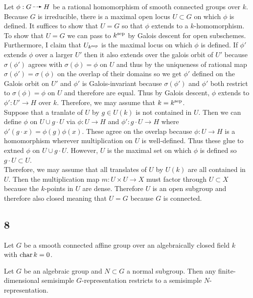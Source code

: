 \documentclass[12pt]{article}
\begin{document}
Let $\phi : G \rat H$ be a rational homomorphism of smooth connected groups over $k$. Because $G$ is irreducible, there is a maximal open locus $U \subset G$ on which $\phi$ is defined. It suffices to show that $U = G$ so that $\phi$ extends to a $k$-homomorphism. To show that $U = G$ we can pass to $k^{\mathrm{sep}}$ by Galois descent for open subschemes. Furthermore, I claim that $U_{k^{\mathrm{sep}}}$ is the maximal locus on which $\phi$ is defined. If $\phi'$ extends $\phi$ over a larger $U'$ then it also extends over the galois orbit of $U'$ because $\sigma(\phi')$ agrees with $\sigma(\phi) = \phi$ on $U$ and thus by the uniqueness of rational map $\sigma(\phi') = \sigma(\phi)$ on the overlap of their domains so we get $\phi'$ defined on the Galois orbit on $U'$ and $\phi'$ is Galois-invariant because $\sigma(\phi')$ and $\phi'$ both restrict to $\sigma(\phi) = \phi$ on $U$ and therefore are equal. Thus by Galois descent, $\phi$ extends to $\phi' : U' \to H$ over $k$. Therefore, we may assume that $k = k^{\mathrm{sep}}$.
\bigskip\\
Suppose that a tranlate of $U$ by $g \in U(k)$ is not contained in $U$. Then we can define $\phi$ on $U \cup g \cdot U$ via $\phi : U \to H$ and $\phi' : g \cdot U \to H$ where $\phi'(g \cdot x) = \phi(g) \phi(x)$. These agree on the overlap because $\phi : U \to H$ is a homomorphism wherever multiplication on $U$ is well-defined. Thus these glue to extned $\phi$ on $U \cup g \cdot U$. However, $U$ is the maximal set on which $\phi$ is defined so $g \cdot U \subset U$. 
\bigskip\\
Therefore, we may assume that all translates of $U$ by $U(k)$ are all contained in $U$. Then the multiplication map $m : U \times U \to X$ must factor through $U \subset X$ because the $k$-points in $U$ are dense. Therefore $U$ is an open subgroup and therefore also closed meaning that $U = G$ because $G$ is connected. 

\subsection{8}

Let $G$ be a smooth connected affine group over an algebraically closed field $k$ with $\operatorname{\mathrm{char}}{k} = 0$. 

\begin{lemma}
Let $G$ be an algebraic group and $N \subset G$ a normal subgroup. Then any finite-dimensional semisimple $G$-representation restricts to a semisimple $N$-representation.
\end{lemma} 
\end{document}

